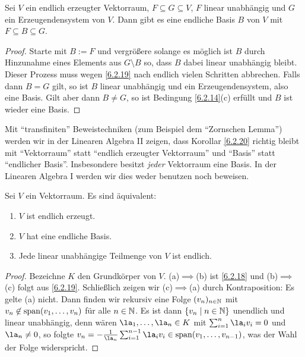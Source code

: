 \documentclass[../../main.tex]{subfiles}
\begin{document}
\begin{kor}\label{6.2.20}
Sei $V$ ein endlich erzeugter Vektorraum, $F\subseteq G\subseteq V$, $F$ linear unabhängig und $G$ ein Erzeugendensystem von $V$. Dann gibt es eine endliche Basis
$B$ von $V$ mit $F\subseteq B\subseteq G$.
\end{kor}
\begin{proof}
Starte mit $B:=F$ und vergrößere solange es möglich ist $B$ durch Hinzunahme eines Elements aus $G\setminus B$ so, dass $B$ dabei linear unabhängig bleibt. Dieser Prozess muss wegen \ref{6.2.19} nach endlich vielen Schritten abbrechen. Falls dann $B=G$ gilt, so ist $B$ linear unabhängig und ein Erzeugendensystem, also eine Basis.
Gilt aber dann $B\ne G$, so ist Bedingung \ref{6.2.14}(c) erfüllt und $B$ ist wieder eine Basis.
\end{proof}

\begin{bem}\label{6.2.21}
Mit "`transfiniten"' Beweistechniken (zum Beispiel dem "`Zornschen Lemma"') werden wir in der Linearen Algebra II zeigen, dass Korollar \ref{6.2.20} richtig bleibt mit
"`Vektorraum"' statt "`endlich erzeugter Vektorraum"' und "`Basis"'  statt "`endlicher Basis"'. Insbesondere besitzt \emph{jeder} Vektorraum eine Basis. In der Linearen Algebra I werden wir dies weder benutzen noch beweisen. 
\end{bem}

\begin{sat}\label{6.2.22}
Sei $V$ ein Vektorraum. Es sind äquivalent:
\begin{enumerate}[\rm(a)]
\item $V$ ist endlich erzeugt.
\item $V$ hat eine endliche Basis.
\item Jede linear unabhängige Teilmenge von $V$ ist endlich.
\end{enumerate}
\end{sat}
\begin{proof}
Bezeichne $K$ den Grundkörper von $V$.
(a)$\implies$(b) ist \ref{6.2.18} und (b)$\implies$(c) folgt aus \ref{6.2.19}. Schließlich zeigen wir (c)$\implies$(a) durch Kontraposition: Es gelte (a) nicht. Dann finden wir rekursiv
eine Folge $(v_n)_{n\in\mathbb N}$ mit $v_n\not\in\operatorname{span}(v_1,\dots,v_n)$ für alle $n\in\mathbb N$. Es ist dann $\{v_n\mid n\in\mathbb N\}$ unendlich und linear unabhängig, denn wären
$\la_1,\dots,\la_n\in K$ mit $\sum_{i=1}^n\la_iv_i=0$ und $\la_n\ne0$, so folgte $v_n=-\frac1{\la_n}\sum_{i=1}^{n-1}\la_iv_i\in\lin(v_1,\dots,v_{n-1})$, was der Wahl der Folge widerspricht.
\end{proof}
\end{document}
